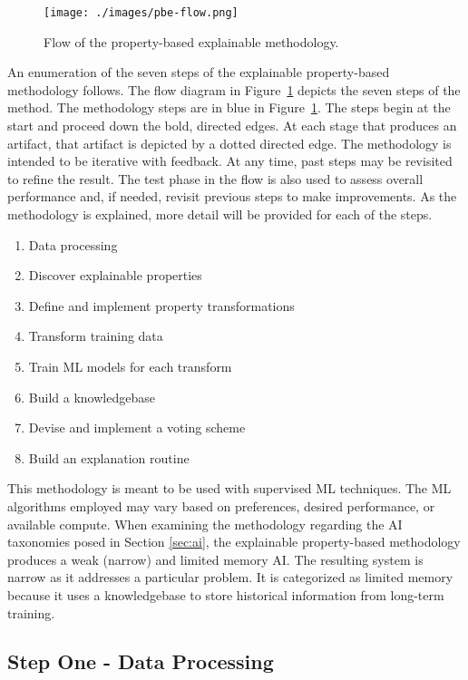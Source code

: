 \begin{figure}[H]
    \centerline{\texttt{[image: ./images/pbe-flow.png]}}
    \caption{Flow of the property-based explainable methodology.}
    \label{fig:prop_xai_flow}
\end{figure}

An enumeration of the seven steps of the explainable property-based methodology
follows. The flow diagram in Figure~\ref{fig:prop_xai_flow} depicts the seven
steps of the method. The methodology steps are in blue in
Figure~\ref{fig:prop_xai_flow}. The steps begin at the start and proceed down
the bold, directed edges. At each stage that produces an artifact, that artifact
is depicted by a dotted directed edge. The methodology is intended to be
iterative with feedback. At any time, past steps may be revisited to refine the
result. The test phase in the flow is also used to assess overall performance
and, if needed, revisit previous steps to make improvements. As the methodology
is explained, more detail will be provided for each of the steps.

\begin{enumerate}
    \item Data processing
    \item Discover explainable properties
    \item Define and implement property transformations
    \item Transform training data
    \item Train ML models for each transform
    \item Build a knowledgebase
    \item Devise and implement a voting scheme
    \item Build an explanation routine
\end{enumerate}


This methodology is meant to be used with supervised ML techniques. The ML
algorithms employed may vary based on preferences, desired performance, or
available compute. When examining the methodology regarding the AI taxonomies
posed in Section \ref{sec:ai}, the explainable property-based methodology
produces a weak (narrow) and limited memory AI. The resulting system is narrow
as it addresses a particular problem. It is categorized as limited memory
because it uses a knowledgebase to store historical information from long-term
training.

\subsection{Step One - Data Processing} %

